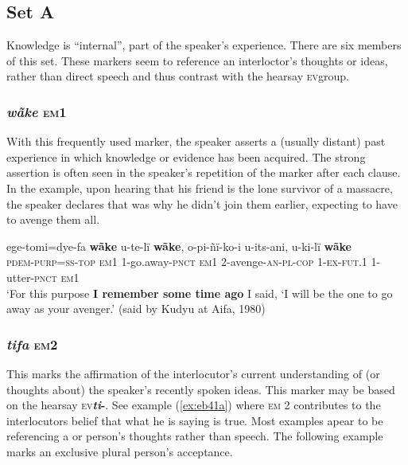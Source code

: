 \documentclass[output=paper]{langsci/langscibook}
\begin{document}
\subsection{Set A}   

Knowledge is ``internal'', part of the speaker’s experience. There are six members of this set.  These markers seem to reference an interloctor’s thoughts or ideas, rather than direct speech and thus contrast with the hearsay \textsc{ev}group.

\subsubsection{\textit{wãke} \textsc{em}1} 
With this frequently used marker, the speaker asserts a (usually distant) past experience in which knowledge or evidence has been acquired. The strong assertion is often seen in the speaker’s repetition of the marker after each clause.  In the example, upon hearing that his friend is the lone survivor of a massacre, the speaker declares that was why he didn’t join them earlier, expecting to have to avenge them all.

 
\begin{exe}
	\ex \label{ex:eb1}
	\gll ege-tomi=dye-fa \textbf{wãke} u-te-lï \textbf{wãke}, o-pi-ñï-ko-i u-its-ani, u-ki-lï \textbf{wãke}\\
	\textsc{pdem}-\textsc{purp}=\textsc{ss}-\textsc{top} \textsc{em1} 1-go.away-\textsc{pnct} \textsc{em1} 2-avenge-\textsc{an-pl-cop} \textsc{1-ex-fut.1} 1-utter-\textsc{pnct} \textsc{em1}\\
	\trans ‘For this purpose \textbf{I remember some time ago} I said, ‘I will be the one to go away as your avenger.’ (said by Kudyu at Aifa, 1980)
\end{exe}

\subsubsection{\textit{tifa} \textsc{em}2}
This marks the affirmation of the interlocutor’s current understanding of  (or thoughts about)  the speaker’s recently spoken ideas. This marker may be based on the hearsay \textsc{ev}\textbf{\textit{ti}-}. See example (\ref{ex:eb41a}) where \textsc{em} 2 contributes to the interlocutors belief that what he is saying is true. Most examples apear to be referencing a  or  person’s thoughts rather than speech.
The following example marks an exclusive plural person’s acceptance. 
\end{document}
